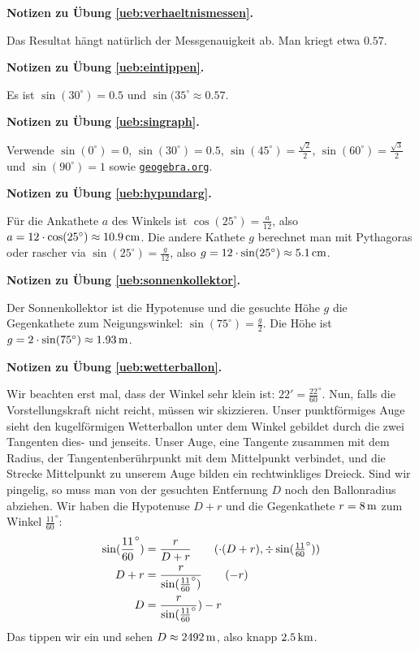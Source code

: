 \documentclass[%
11pt,%
twoside,%
titlepage,%
swissgerman,%
headsepline%
]{scrartcl}
\newcommand{\faReturnGray}{\textcolor{gray}{\faMailReply}} %
\newcommand{\geogebralink}{\href{https://www.geogebra.org/calculator}{\texttt{geogebra.org}}}
\theoremstyle{definition}
\theoremstyle{plain}
\newcommand{\concatueb}[1]{ueb:#1}%
\newcommand{\concatlsg}[1]{lsg:#1}%
\newenvironment{lsg}[1]{%
    \par\noindent\textbf{Notizen zu Übung \ref{\concatueb{#1}}.}%
    \label{\concatlsg{#1}} %
    \hfill\hyperref[\concatueb{#1}]{\faReturnGray}\par %
}{%
    \par%
}
\begin{document}
\begin{lsg}{verhaeltnismessen}
Das Resultat h\"angt nat\"urlich der Messgenauigkeit ab. Man kriegt etwa $0.57$.
\end{lsg}

\begin{lsg}{eintippen}
Es ist $\sin(30^\circ)=0.5$ und $\sin(35^{\circ}\approx0.57$.
\end{lsg}

\begin{lsg}{singraph}
Verwende $\sin(0^{\circ})=0$, $\sin(30^{\circ})=0.5$, $\sin(45^{\circ})=\frac{\sqrt{2}}{2}$,  $\sin(60^{\circ})=\frac{\sqrt{3}}{2}$ und  $\sin(90^{\circ})=1$ sowie \geogebralink .
\end{lsg}

\begin{lsg}{hypundarg}
F\"ur die Ankathete $a$ des Winkels ist $\cos(25^\circ)=\frac{a}{12}$, also $a=12\cdot\cos(25^\circ)\approx\unit[10.9]{cm}$. Die andere Kathete $g$ berechnet man mit Pythagoras oder rascher via $\sin(25^\circ)=\frac{g}{12}$, also $g=12\cdot\sin(25^\circ)\approx\unit[5.1]{cm}$.
\end{lsg}

\begin{lsg}{sonnenkollektor}
Der Sonnenkollektor ist die Hypotenuse und die gesuchte H\"ohe $g$ die Gegenkathete zum Neigungswinkel: $\sin(75^{\circ})=\frac{g}{2}$. Die H\"ohe ist $g=2\cdot\sin(75^{\circ})\approx\unit[1.93]{m}$.
\end{lsg}

\begin{lsg}{wetterballon}
Wir beachten erst mal, dass der Winkel sehr klein ist: $22'=\frac{22}{60}^{\circ}$. Nun, falls die Vorstellungskraft nicht reicht, m\"ussen wir skizzieren. Unser punktf\"ormiges Auge sieht den kugelf\"ormigen Wetterballon unter dem Winkel gebildet durch die zwei Tangenten dies- und jenseits. Unser Auge, eine Tangente zusammen mit dem Radius, der Tangentenber\"uhrpunkt mit dem Mittelpunkt verbindet, und die Strecke Mittelpunkt zu unserem Auge bilden ein rechtwinkliges Dreieck. Sind wir pingelig, so muss man von der gesuchten Entfernung $D$ noch den Ballonradius abziehen. Wir haben die Hypotenuse $D+r$ und die Gegenkathete $r=\unit[8]{m}$ zum Winkel $\frac{11}{60}^{\circ}$:
\begin{align*}
\sin(\frac{11}{60}^{\circ}) &= \frac{r}{D+r}\tag{$\cdot(D+r), \div\sin(\frac{11}{60}^{\circ})$}\\
D+r &= \frac{r}{\sin(\frac{11}{60}^{\circ})}\tag{$-r$}\\
D &= \frac{r}{\sin(\frac{11}{60}^{\circ}})-r
\end{align*}
Das tippen wir ein und sehen $D\approx\unit[2492]{m}$, also knapp $\unit[2.5]{km}$.
\end{lsg}
\end{document}
